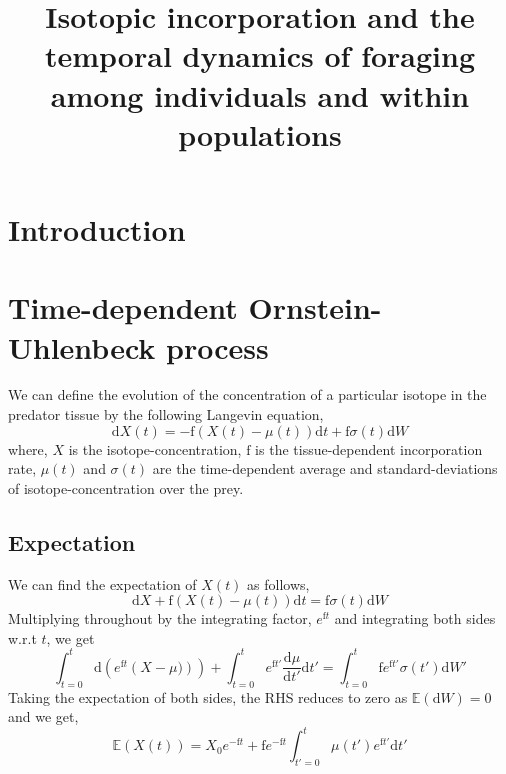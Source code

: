 \documentclass[12pt]{iopart}
\begin{document}
\title{Isotopic incorporation and the temporal dynamics of foraging among individuals and within populations}
\begin{abstract}
\end{abstract}
\maketitle

\section{Introduction}

\section{Time-dependent Ornstein-Uhlenbeck process}
We can define the evolution of the concentration of a particular isotope in the predator tissue by the following Langevin equation,
\begin{equation}
\label{langevin}
\mathrm{d}X(t) = - \mathrm{f}\left(X(t)-\mu(t)\right)\mathrm{d}t + \mathrm{f}\sigma(t)\mathrm{d}W
\end{equation}
where, $X$ is the isotope-concentration, $\mathrm{f}$ is the tissue-dependent incorporation rate, $\mu(t)$ and $\sigma(t)$ are the time-dependent average and standard-deviations of isotope-concentration over the prey.
\subsection{Expectation}
 We can find the expectation of $X(t)$ as follows,
\begin{equation}
\label{EX1}
\mathrm{d}X + \mathrm{f}\left(X(t)-\mu(t)\right)\mathrm{d}t = \mathrm{f}\sigma(t)\mathrm{d}W
\end{equation}
Multiplying throughout by the integrating factor, $e^{\mathrm{f}t}$ and integrating both sides w.r.t $t$, we get
\begin{equation}
\label{EX2}
\int_{t=0}^t \mathrm{d}\left(e^{\mathrm{f}t}\left(X-\mu)\right)\right) + \int_{t=0}^t e^{\mathrm{f}t'}\frac{\mathrm{d}\mu}{\mathrm{d}t'}\mathrm{d}t' = \int_{t=0}^t\mathrm{f}e^{\mathrm{f}t'}\sigma(t')\mathrm{d}W'
\end{equation}
Taking the expectation of both sides, the RHS reduces to zero as $\mathbb{E}(\mathrm{d}W)=0$ and we get,
\begin{equation}
\label{EX-final}
\mathbb{E}(X(t)) = X_0 e^{-\mathrm{f}t} + \mathrm{f}e^{-\mathrm{f}t}\int_{t'=0}^t\mu(t')e^{\mathrm{f}t'}\mathrm{d}t'
\end{equation}
\end{document}
